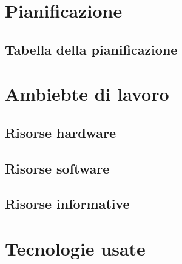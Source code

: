 \section{Pianificazione}




\subsection{Tabella della pianificazione}

\section{Ambiebte di lavoro}
\subsection{Risorse hardware}
\subsection{Risorse software}
\subsection{Risorse informative}

\section{Tecnologie usate}
